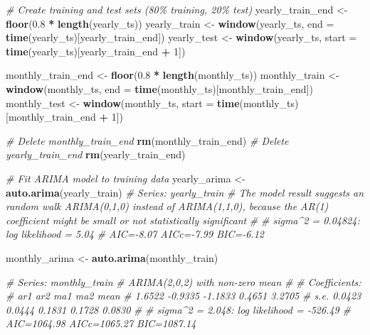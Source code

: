 \documentclass[
]{article}
\newenvironment{Shaded}{\begin{snugshade}}{\end{snugshade}}
\newcommand{\AttributeTok}[1]{\textcolor[rgb]{0.13,0.29,0.53}{#1}}
\newcommand{\CommentTok}[1]{\textcolor[rgb]{0.56,0.35,0.01}{\textit{#1}}}
\newcommand{\DecValTok}[1]{\textcolor[rgb]{0.00,0.00,0.81}{#1}}
\newcommand{\FloatTok}[1]{\textcolor[rgb]{0.00,0.00,0.81}{#1}}
\newcommand{\FunctionTok}[1]{\textcolor[rgb]{0.13,0.29,0.53}{\textbf{#1}}}
\newcommand{\NormalTok}[1]{#1}
\newcommand{\OtherTok}[1]{\textcolor[rgb]{0.56,0.35,0.01}{#1}}
\newcommand{\SpecialCharTok}[1]{\textcolor[rgb]{0.81,0.36,0.00}{\textbf{#1}}}
\begin{document}
\begin{Shaded}
\begin{Highlighting}[]
\CommentTok{\# Create training and test sets (80\% training, 20\% test)}
\NormalTok{yearly\_train\_end }\OtherTok{\textless{}{-}} \FunctionTok{floor}\NormalTok{(}\FloatTok{0.8} \SpecialCharTok{*} \FunctionTok{length}\NormalTok{(yearly\_ts))}
\NormalTok{yearly\_train }\OtherTok{\textless{}{-}} \FunctionTok{window}\NormalTok{(yearly\_ts, }\AttributeTok{end =} \FunctionTok{time}\NormalTok{(yearly\_ts)[yearly\_train\_end])}
\NormalTok{yearly\_test }\OtherTok{\textless{}{-}} \FunctionTok{window}\NormalTok{(yearly\_ts, }\AttributeTok{start =} \FunctionTok{time}\NormalTok{(yearly\_ts)[yearly\_train\_end }\SpecialCharTok{+} \DecValTok{1}\NormalTok{])}

\NormalTok{monthly\_train\_end }\OtherTok{\textless{}{-}} \FunctionTok{floor}\NormalTok{(}\FloatTok{0.8} \SpecialCharTok{*} \FunctionTok{length}\NormalTok{(monthly\_ts))}
\NormalTok{monthly\_train }\OtherTok{\textless{}{-}} \FunctionTok{window}\NormalTok{(monthly\_ts, }\AttributeTok{end =} \FunctionTok{time}\NormalTok{(monthly\_ts)[monthly\_train\_end])}
\NormalTok{monthly\_test }\OtherTok{\textless{}{-}} \FunctionTok{window}\NormalTok{(monthly\_ts, }\AttributeTok{start =} \FunctionTok{time}\NormalTok{(monthly\_ts)[monthly\_train\_end }\SpecialCharTok{+} \DecValTok{1}\NormalTok{])}

\CommentTok{\# Delete monthly\_train\_end}
\FunctionTok{rm}\NormalTok{(monthly\_train\_end)}
\CommentTok{\# Delete yearly\_train\_end}
\FunctionTok{rm}\NormalTok{(yearly\_train\_end)}

\CommentTok{\# Fit ARIMA model to training data}
\NormalTok{yearly\_arima }\OtherTok{\textless{}{-}} \FunctionTok{auto.arima}\NormalTok{(yearly\_train)}
\CommentTok{\# Series: yearly\_train }
\CommentTok{\# The model result suggests an random walk ARIMA(0,1,0) instead of ARIMA(1,1,0), because the AR(1) coefficient might be small or not statistically significant}
\CommentTok{\# }
\CommentTok{\# sigma\^{}2 = 0.04824:  log likelihood = 5.04}
\CommentTok{\# AIC={-}8.07   AICc={-}7.99   BIC={-}6.12}

\NormalTok{monthly\_arima }\OtherTok{\textless{}{-}} \FunctionTok{auto.arima}\NormalTok{(monthly\_train)}

\CommentTok{\# Series: monthly\_train }
\CommentTok{\# ARIMA(2,0,2) with non{-}zero mean }
\CommentTok{\# }
\CommentTok{\# Coefficients:}
\CommentTok{\#          ar1      ar2      ma1     ma2    mean}
\CommentTok{\#       1.6522  {-}0.9335  {-}1.1833  0.4651  3.2705}
\CommentTok{\# s.e.  0.0423   0.0444   0.1831  0.1728  0.0830}
\CommentTok{\# }
\CommentTok{\# sigma\^{}2 = 2.048:  log likelihood = {-}526.49}
\CommentTok{\# AIC=1064.98   AICc=1065.27   BIC=1087.14}



\end{Highlighting}
\end{Shaded}
\end{document}
